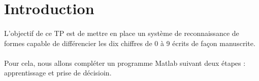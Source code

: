 \section{Introduction}

\paragraph{}
L'objectif de ce TP est de mettre en place un système de reconnaissance de formes capable de différencier les dix chiffres de 0 à 9 écrits de façon manuscrite. 

\paragraph{}
Pour cela, nous allons compléter un programme Matlab suivant deux étapes : apprentissage et prise de décisioin. 
